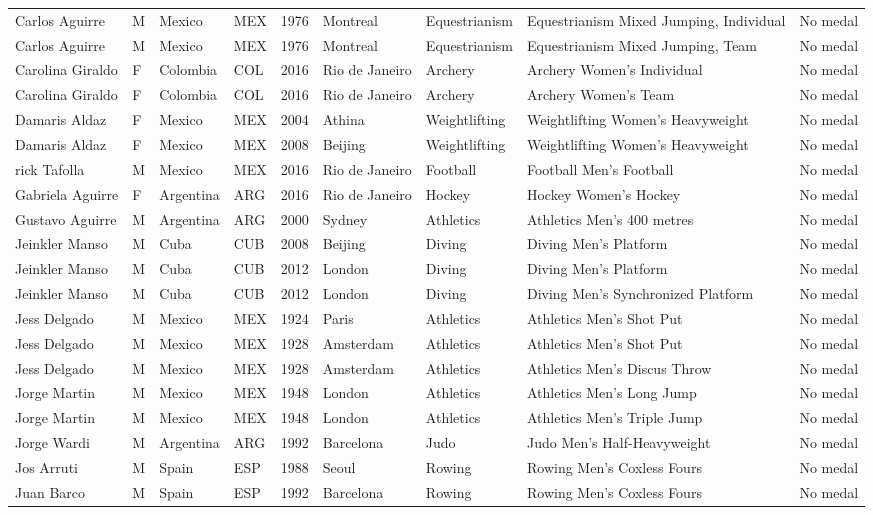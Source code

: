 \documentclass{article}%
\begin{document}
\begin{longtable}{l l l l l l l l l}
Carlos Aguirre&M&Mexico&MEX&1976&Montreal&Equestrianism&Equestrianism Mixed Jumping, Individual&No medal\\%
Carlos Aguirre&M&Mexico&MEX&1976&Montreal&Equestrianism&Equestrianism Mixed Jumping, Team&No medal\\%
Carolina Giraldo&F&Colombia&COL&2016&Rio de Janeiro&Archery&Archery Women's Individual&No medal\\%
Carolina Giraldo&F&Colombia&COL&2016&Rio de Janeiro&Archery&Archery Women's Team&No medal\\%
Damaris Aldaz&F&Mexico&MEX&2004&Athina&Weightlifting&Weightlifting Women's Heavyweight&No medal\\%
Damaris Aldaz&F&Mexico&MEX&2008&Beijing&Weightlifting&Weightlifting Women's Heavyweight&No medal\\%
rick Tafolla&M&Mexico&MEX&2016&Rio de Janeiro&Football&Football Men's Football&No medal\\%
Gabriela Aguirre&F&Argentina&ARG&2016&Rio de Janeiro&Hockey&Hockey Women's Hockey&No medal\\%
Gustavo Aguirre&M&Argentina&ARG&2000&Sydney&Athletics&Athletics Men's 400 metres&No medal\\%
Jeinkler Manso&M&Cuba&CUB&2008&Beijing&Diving&Diving Men's Platform&No medal\\%
Jeinkler Manso&M&Cuba&CUB&2012&London&Diving&Diving Men's Platform&No medal\\%
Jeinkler Manso&M&Cuba&CUB&2012&London&Diving&Diving Men's Synchronized Platform&No medal\\%
Jess Delgado&M&Mexico&MEX&1924&Paris&Athletics&Athletics Men's Shot Put&No medal\\%
Jess Delgado&M&Mexico&MEX&1928&Amsterdam&Athletics&Athletics Men's Shot Put&No medal\\%
Jess Delgado&M&Mexico&MEX&1928&Amsterdam&Athletics&Athletics Men's Discus Throw&No medal\\%
Jorge Martin&M&Mexico&MEX&1948&London&Athletics&Athletics Men's Long Jump&No medal\\%
Jorge Martin&M&Mexico&MEX&1948&London&Athletics&Athletics Men's Triple Jump&No medal\\%
Jorge Wardi&M&Argentina&ARG&1992&Barcelona&Judo&Judo Men's Half{-}Heavyweight&No medal\\%
Jos Arruti&M&Spain&ESP&1988&Seoul&Rowing&Rowing Men's Coxless Fours&No medal\\%
Juan Barco&M&Spain&ESP&1992&Barcelona&Rowing&Rowing Men's Coxless Fours&No medal\\%

\end{longtable}
\end{document}
